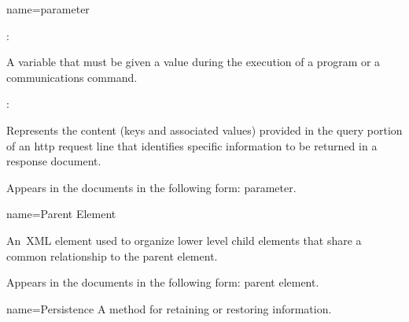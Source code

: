 {
  name={parameter}
}
{
	:

	A variable that must be given a value during the execution of a program or a communications command.

	:

	Represents the content (keys and associated values) provided in the \gls{query} portion of an \gls{http request line} that identifies specific information to be returned in a \gls{response document}.

	Appears in the documents in the following form: parameter.
}


{
  name={Parent Element}
}
{
	An XML element used to organize \gls{lower level} child elements that share a common relationship to the \gls{parent element}.

	Appears in the documents in the following form: \gls{parent element}.
}


{
  name={Persistence}
}
{
	A method for retaining or restoring information.
}


